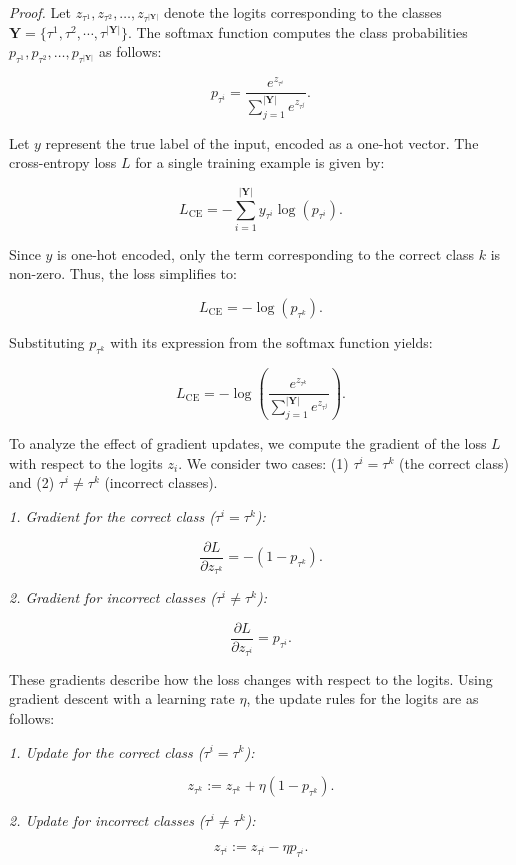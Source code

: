 \textit{Proof.}
Let \( z_{\tau^1}, z_{\tau^2}, \dots, z_{\tau^{|\bm{Y}|}} \) denote the logits corresponding to the classes \( \bm{Y}=\{\tau^1,\tau^2,\cdots,\tau^{|\bm{Y}|}\} \). The softmax function computes the class probabilities \( p_{\tau^1}, p_{\tau^2}, \dots, p_{\tau^{|\bm{Y}|}} \) as follows:

\[
p_{\tau^i} = \frac{e^{z_{\tau^i}}}{\sum_{j=1}^{|\bm{Y}|} e^{z_{\tau^j}}}.
\]

Let \( y \) represent the true label of the input, encoded as a one-hot vector. The cross-entropy loss \( L \) for a single training example is given by:

\[
L_{\text{CE}} = -\sum_{i=1}^{|\bm{Y}|} y_{\tau^i} \log(p_{\tau^i}).
\]

Since \( y \) is one-hot encoded, only the term corresponding to the correct class \( k \) is non-zero. Thus, the loss simplifies to:

\[
L_{\text{CE}} = -\log(p_{\tau^k}).
\]

Substituting \( p_{\tau^k} \) with its expression from the softmax function yields:

\[
L_{\text{CE}} = -\log\left(\frac{e^{z_{\tau^k}}}{\sum_{j=1}^{|\bm{Y}|} e^{z_{\tau^j}}}\right).
\]

To analyze the effect of gradient updates, we compute the gradient of the loss \( L \) with respect to the logits \( z_i \). We consider two cases: (1) \( \tau^i = \tau^k \) (the correct class) and (2) \( \tau^i \neq \tau^k \) (incorrect classes).

\textit{1. Gradient for the correct class (\( \tau^i = \tau^k \)):}

\[
\frac{\partial L}{\partial z_{\tau^k}} = -\left(1 - p_{\tau^k}\right).
\]

\textit{2. Gradient for incorrect classes (\( \tau^i \neq \tau^k \)):}

\[
\frac{\partial L}{\partial z_{\tau^i}} = p_{\tau^i}.
\]

These gradients describe how the loss changes with respect to the logits. Using gradient descent with a learning rate \( \eta \), the update rules for the logits are as follows:

\textit{1. Update for the correct class (\( {\tau^i} = {\tau^k} \)):}

\[
z_{\tau^k} := z_{\tau^k} + \eta (1 - p_{\tau^k}).
\]

\textit{2. Update for incorrect classes (\( {\tau^i} \neq {\tau^k} \)):}

\[
z_{\tau^i} := z_{\tau^i} - \eta p_{\tau^i}.
\]


